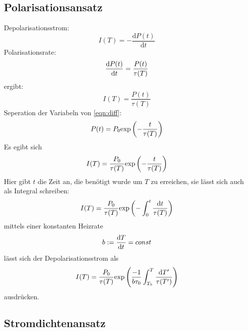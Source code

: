 	\subsection{Polarisationsansatz}
		Depolarisationsstrom:	
		\begin{equation}
			I(T) = - \frac{\text{d}P(t)}{\text{d}t}
		\end{equation}
		Polarisationsrate:
		\begin{equation}
			\frac{\text{d} P(t)}{\text{d} t} = \frac{P(t)}{\tau(T)}
			\label{eqn:diff}
		\end{equation}
		ergibt:
		\begin{equation}
			I(T) = \frac{P(t)}{\tau(T)}
		\end{equation}
		Seperation der Variabeln von \ref{eqn:diff}:
		\begin{equation}
			P(t) = P_0 \text{exp}\left(- \frac{t}{\tau(T)} \right)
		\end{equation}
		Es egibt sich
		\begin{equation}
			I(T) = \frac{P_0}{\tau(T)} \text{exp}\left(-\frac{t}{\tau(T)}\right)
		\end{equation}
		Hier gibt $t$ die Zeit an, die benötigt wurde um $T$ zu erreichen, sie lässt sich auch als Integral schreiben:
		\begin{equation}
			I(T) = \frac{P_0}{\tau(T)} \text{exp}\left(-\int_0^t\frac{\text{d}t}{\tau(T)}\right)
			\end{equation}
		mittels einer konstanten Heizrate
		\begin{equation}
			b := \frac{\text{d} T}{\text{d} t} = const
		\end{equation}
		lässt sich der Depolarisationsstrom als 
		\begin{equation}
			I(T) = \frac{P_0}{\tau(T)} \text{exp}\left(\frac{-1}{b\tau_0}\int_{T_0}^T\frac{\text{d}T'}{\tau(T')}\right)
		\end{equation}
		ausdrücken.

	\subsection{Stromdichtenansatz}
		
